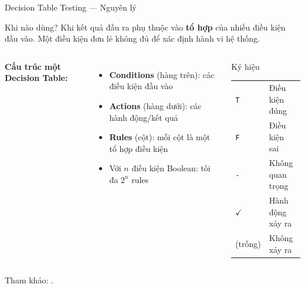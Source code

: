 \documentclass[aspectratio=169,12pt]{beamer}
\begin{document}
\begin{frame}{Decision Table Testing --- Nguyên lý}
  \begin{block}{Khi nào dùng?}
    Khi kết quả đầu ra phụ thuộc vào \textbf{tổ hợp} của nhiều điều kiện
    đầu vào. Một điều kiện đơn lẻ không đủ để xác định hành vi hệ thống.
  \end{block}

  \vspace{0.5em}
  \begin{columns}[T,onlytextwidth]
    \textbf{Cấu trúc một Decision Table:}
    \begin{itemize}
      \item \textbf{Conditions} (hàng trên): các điều kiện đầu vào
      \item \textbf{Actions} (hàng dưới): các hành động/kết quả
      \item \textbf{Rules} (cột): mỗi cột là một tổ hợp điều kiện
      \item Với $n$ điều kiện Boolean: tối đa $2^n$ rules
    \end{itemize}

    \begin{block}{Ký hiệu}
      {\small
      \begin{tabular}{ll}
        \texttt{T} & Điều kiện đúng \\
        \texttt{F} & Điều kiện sai \\
        \texttt{-} & Không quan trọng \\
        $\checkmark$ & Hành động xảy ra \\
        (trống) & Không xảy ra \\
      \end{tabular}
      }
    \end{block}
  \end{columns}

  \vspace{-0.2em}
  {\scriptsize Tham khảo: \cite{istqb-ctfl,myers-testing}.}
\end{frame}
\end{document}
